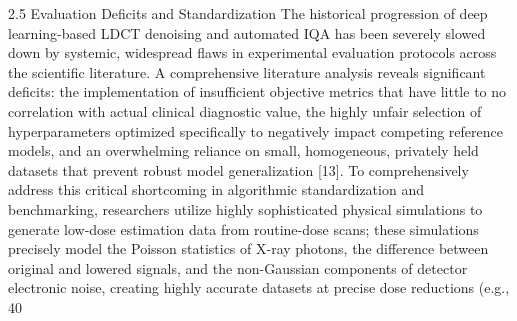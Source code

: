 2.5 Evaluation Deficits and Standardization The historical progression of deep learning-based LDCT denoising and automated IQA has been severely slowed down by systemic, widespread flaws in experimental evaluation protocols across the scientific literature. A comprehensive literature analysis reveals significant deficits: the implementation of insufficient objective metrics that have little to no correlation with actual clinical diagnostic value, the highly unfair selection of hyperparameters optimized specifically to negatively impact competing reference models, and an overwhelming reliance on small, homogeneous, privately held datasets that prevent robust model generalization [13]. To comprehensively address this critical shortcoming in algorithmic standardization and benchmarking, researchers utilize highly sophisticated physical simulations to generate low-dose estimation data from routine-dose scans; these simulations precisely model the Poisson statistics of X-ray photons, the difference between original and lowered signals, and the non-Gaussian components of detector electronic noise, creating highly accurate datasets at precise dose reductions (e.g., 40%
